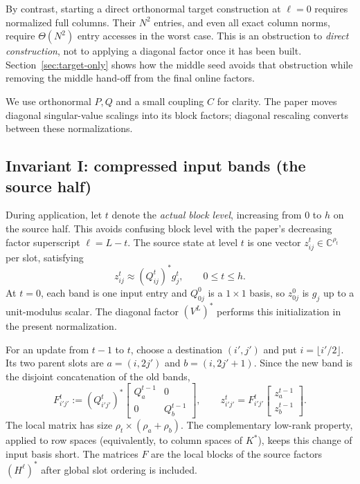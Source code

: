 \documentclass[11pt]{article}
\newcommand{\C}{\mathbb{C}}
\begin{document}
By contrast, starting a direct orthonormal target construction at $\ell=0$ requires normalized full columns.  Their $N^2$ entries, and even all exact column norms, require $\Theta(N^2)$ entry accesses in the worst case.  This is an obstruction to \emph{direct construction}, not to applying a diagonal factor once it has been built.  Section~\ref{sec:target-only} shows how the middle seed avoids that obstruction while removing the middle hand-off from the final online factors.

We use orthonormal $P,Q$ and a small coupling $C$ for clarity.  The paper moves diagonal singular-value scalings into its block factors; diagonal rescaling converts between these normalizations.

\subsection{Invariant I: compressed input bands (the source half)}
\label{sec:source-invariant}

During application, let $t$ denote the \emph{actual block level}, increasing from $0$ to $h$ on the source half.  This avoids confusing block level with the paper's decreasing factor superscript $\ell=L-t$.  The source state at level $t$ is one vector $z_{ij}^{t}\in\C^{\rho_t}$ per slot, satisfying
\[
 \boxed{\quad z_{ij}^{t}\approx(Q_{ij}^{t})^*g_j^t,\qquad0\le t\le h. \quad}
 \tag{6}\label{eq:source-invariant}
\]
At $t=0$, each band is one input entry and $Q_{0j}^0$ is a $1\times1$ basis, so $z_{0j}^0$ is $g_j$ up to a unit-modulus scalar.  The diagonal factor $(V^L)^*$ performs this initialization in the present normalization.

For an update from $t-1$ to $t$, choose a destination $(i',j')$ and put $i=\lfloor i'/2\rfloor$.  Its two parent slots are $a=(i,2j')$ and $b=(i,2j'+1)$.  Since the new band is the disjoint concatenation of the old bands,
\[
 F_{i'j'}^{t}:=(Q_{i'j'}^{t})^*
 \begin{bmatrix}Q_a^{t-1}&0\\0&Q_b^{t-1}\end{bmatrix},
 \qquad
 z_{i'j'}^{t}=F_{i'j'}^{t}
 \begin{bmatrix}z_a^{t-1}\\z_b^{t-1}\end{bmatrix} .
 \tag{7}\label{eq:source-update}
\]
The local matrix has size $\rho_t\times(\rho_a+\rho_b)$.  The complementary low-rank property, applied to row spaces (equivalently, to column spaces of $K^*$), keeps this change of input basis short.  The matrices $F$ are the local blocks of the source factors $(H^\ell)^*$ after global slot ordering is included.
\end{document}
